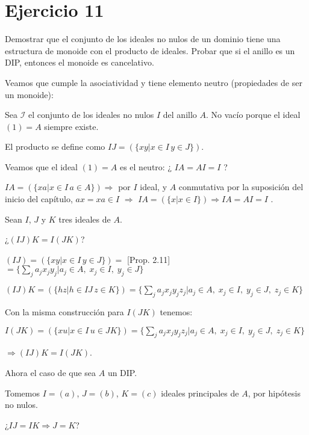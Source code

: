 \documentclass[10pt,a4paper]{article}
\begin{document}
	
	
	
	
	\section*{Ejercicio 11}
	
	Demostrar que el conjunto de los ideales no nulos de un dominio tiene una estructura de monoide con el producto de ideales. Probar que si el anillo es un DIP, entonces el monoide es cancelativo.
	
	\hfill
	
	
	Veamos que cumple la asociatividad y tiene elemento neutro (propiedades de ser un monoide):
	
	Sea $\mathcal{I}$ el conjunto de los ideales no nulos $I$ del anillo $A$. No vacío porque el ideal $(1) = A$ siempre existe.
	
	El producto se define como $ IJ = \left( \{ xy \vert x\in I \, y \in J \} \right)  $.
	
	Veamos que el ideal $(1) = A $ es el neutro: ¿ $I A = AI = I $ ?
	
	$ IA = \left( \{ xa \vert x\in I \, a \in A \} \right)  \Rightarrow  $ por $I$ ideal, y $A$ conmutativa por la suposición del inicio del capítulo, $ax = xa \in I$ $ \Rightarrow $ $ IA =  \left( \{ x \vert x\in I \} \right) \Rightarrow IA = AI = I$ .
	
	Sean $I$, $J$ y $K$ tres ideales de $A$.
	
	¿$(IJ)K = I(JK)$?
	
	$(IJ) =  \left( \{ xy \vert x\in I \, y \in J \} \right)  = $ [Prop. 2.11] $ = \{ \sum_j a_j x_j y_j \vert a_j \in A, \; x_j \in I, \; y_j \in J \}$
	
	$(IJ)K =  \left( \{ hz \vert h\in IJ \, z \in K \} \right) =  \{ \sum_j a_j x_j y_j z_j \vert a_j \in A, \; x_j \in I, \; y_j \in J, \; z_j \in K \} $ 
	
	Con la misma construcción para $I(JK)$ tenemos:
	
	$I(JK) =  \left( \{ xu \vert x\in I \, u \in JK \} \right) =  \{ \sum_j a_j x_j y_j z_j \vert a_j \in A, \; x_j \in I, \; y_j \in J, \; z_j \in K \} $ 
	
	$\Rightarrow (IJ)K = I(JK)$.
	
	\hfil
	
	Ahora el caso de que sea $A$ un DIP.
	
	Tomemos $I=(a)$, $J=(b)$, $K=(c)$ ideales principales de $A$, por hipótesis no nulos.
	
	¿$IJ=IK \Rightarrow J=K$?
	
\end{document}
